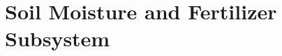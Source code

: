 \documentclass[../main]{subfiles}
\begin{document}
\chapter{Soil Moisture and Fertilizer Subsystem} \label{chp:soilMoistFertSubsystem}

%




\end{document}
